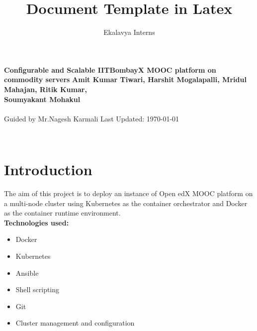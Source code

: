 \documentclass[12pt]{article}
\title{Document Template in Latex}
\author{Ekalavya Interns}
\begin{document}
\begin{titlepage}
 \begin{center}
\Huge
\textbf{Configurable and Scalable IITBombayX MOOC platform on commodity servers} 
\vfill
\LARGE
\textbf{Amit Kumar Tiwari, Harshit Mogalapalli, Mridul Mahajan, Ritik Kumar,\\ Soumyakant Mohakul\\}
\textbf{\\}
Guided by Mr.Nagesh Karmali
\vfill
\Large
Last Updated: \today
\end{center}
\end{titlepage}

 \pagebreak \textcolor{white}{text} \pagebreak
\thispagestyle{empty}

\pagebreak
\setcounter{page}{1}

\listoffigures

\pagebreak


\tableofcontents

\pagebreak

\setcounter{page}{1}

\section{Introduction}

The aim of this project is to deploy an instance of Open edX MOOC platform on a multi-node cluster using Kubernetes as the container orchestrator and Docker as the container runtime environment. \\

\textbf{Technologies used:}
\begin{itemize}
	\item Docker
	\item Kubernetes
	\item Ansible
	\item Shell scripting
	\item Git
	\item Cluster management and configuration
\end{itemize}


\end{document}
